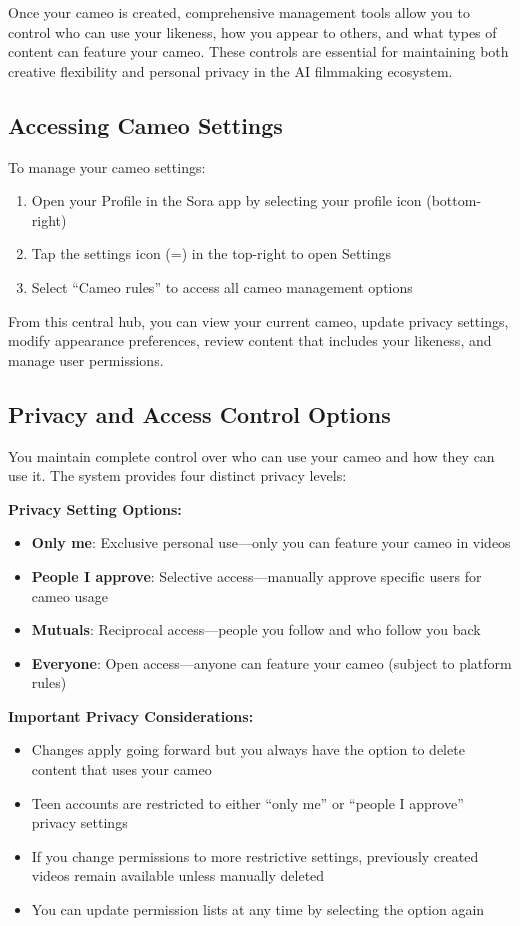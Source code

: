 Once your cameo is created, comprehensive management tools allow you to control who can use your likeness, how you appear to others, and what types of content can feature your cameo. These controls are essential for maintaining both creative flexibility and personal privacy in the AI filmmaking ecosystem.

\subsection{Accessing Cameo Settings}

To manage your cameo settings:
\begin{enumerate}
\item Open your Profile in the Sora app by selecting your profile icon (bottom-right)
\item Tap the settings icon (=) in the top-right to open Settings
\item Select ``Cameo rules'' to access all cameo management options
\end{enumerate}

From this central hub, you can view your current cameo, update privacy settings, modify appearance preferences, review content that includes your likeness, and manage user permissions.

\subsection{Privacy and Access Control Options}

You maintain complete control over who can use your cameo and how they can use it. The system provides four distinct privacy levels:

\textbf{Privacy Setting Options:}
\begin{itemize}
\item \textbf{Only me}: Exclusive personal use—only you can feature your cameo in videos
\item \textbf{People I approve}: Selective access—manually approve specific users for cameo usage
\item \textbf{Mutuals}: Reciprocal access—people you follow and who follow you back
\item \textbf{Everyone}: Open access—anyone can feature your cameo (subject to platform rules)
\end{itemize}

\textbf{Important Privacy Considerations:}
\begin{itemize}
\item Changes apply going forward but you always have the option to delete content that uses your cameo
\item Teen accounts are restricted to either ``only me'' or ``people I approve'' privacy settings
\item If you change permissions to more restrictive settings, previously created videos remain available unless manually deleted
\item You can update permission lists at any time by selecting the option again \citep{openai2024cameos}
\end{itemize}

